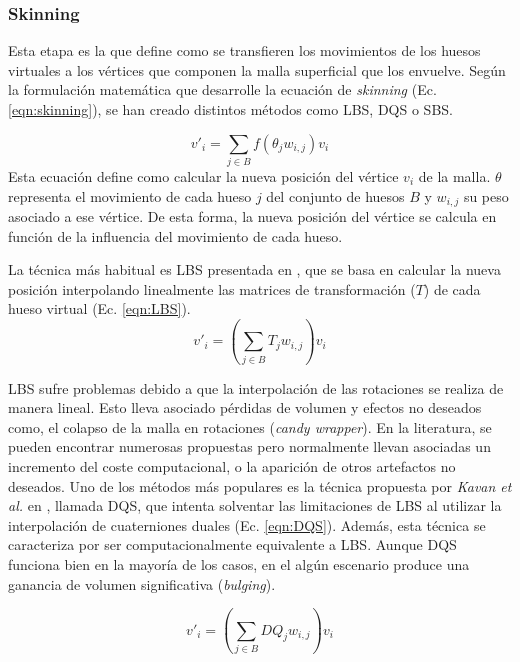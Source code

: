 \subsubsection{Skinning}
\label{art:skinning}

Esta etapa es la que define como se transfieren los movimientos de los huesos virtuales a los vértices que componen la malla superficial que los envuelve. Según la formulación matemática que desarrolle la ecuación de \emph{skinning} (Ec. \ref{eqn:skinning}), se han creado distintos métodos como \ac{LBS}, \ac{DQS} o \ac{SBS}.

\begin{equation}
\label{eqn:skinning}
v'_{i} = \sum_{j \in B} f(\theta_{j}w_{i,j}) v_{i}
\end{equation}
Esta ecuación define como calcular la nueva posición del vértice $v_{i}$ de la malla. $\theta$ representa el movimiento de cada hueso $j$ del conjunto de huesos $B$ y $w_{i,j}$ su peso asociado a ese vértice. De esta forma, la nueva posición del vértice se calcula en función de la influencia del movimiento de cada hueso.

La técnica más habitual es \ac{LBS} presentada en \cite{thalmann88}, que se basa en calcular la nueva posición interpolando linealmente las matrices de transformación ($T$) de cada hueso virtual (Ec. \ref{eqn:LBS}).
\begin{equation}
\label{eqn:LBS}
v'_{i} = (\sum_{j \in B} T_{j}w_{i,j}) v_{i}
\end{equation}

\ac{LBS} sufre problemas debido a que la interpolación de las rotaciones se realiza de manera lineal. Esto lleva asociado pérdidas de volumen y efectos no deseados como, el colapso de la malla en rotaciones (\emph{candy wrapper}). En la literatura, se pueden encontrar numerosas propuestas \cite{rumman2016state} pero normalmente llevan asociadas un incremento del coste computacional, o la aparición de otros artefactos no deseados. Uno de los métodos más populares es la técnica propuesta por \emph{Kavan et al.} en \cite{Kavan2008}, llamada \ac{DQS}, que intenta solventar las limitaciones de \ac{LBS} al utilizar la interpolación de cuaterniones duales (Ec. \ref{eqn:DQS}). Además, esta técnica se caracteriza por ser computacionalmente equivalente a \ac{LBS}. Aunque \ac{DQS} funciona bien en la mayoría de los casos, en el algún escenario produce una ganancia de volumen significativa (\emph{bulging}). 

\begin{equation}
\label{eqn:DQS}
v'_{i} = (\sum_{j \in B} DQ_{j}w_{i,j}) v_{i}
\end{equation}

